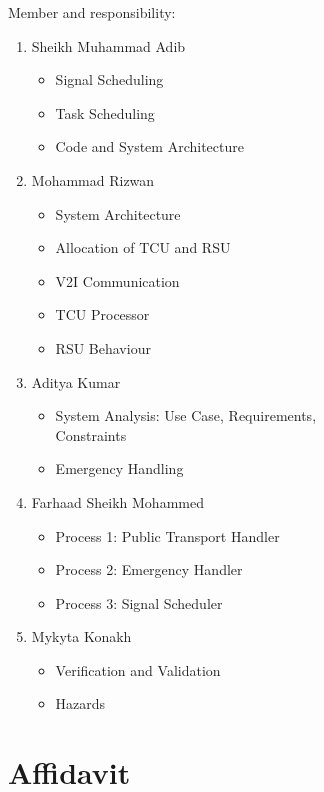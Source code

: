 \documentclass[conference]{IEEEtran}
\begin{document}
Member and responsibility:
\begin{enumerate}
\item Sheikh Muhammad Adib
\begin{itemize}
    \item Signal Scheduling
    \item Task Scheduling
    \item Code and System Architecture
\end{itemize}

\item Mohammad Rizwan
\begin{itemize}
    \item System Architecture
    \item Allocation of TCU and RSU
    \item V2I Communication
    \item TCU Processor
    \item RSU Behaviour
\end{itemize}

\item Aditya Kumar
\begin{itemize}
    \item System Analysis: Use Case, Requirements,\\Constraints
    \item Emergency Handling
\end{itemize}

\item Farhaad Sheikh Mohammed
\begin{itemize}
    \item Process 1: Public Transport Handler
    \item Process 2: Emergency Handler
    \item Process 3: Signal Scheduler
\end{itemize}

\item Mykyta Konakh
\begin{itemize}
    \item Verification and Validation
    \item Hazards
\end{itemize}
\end{enumerate}

\section*{Affidavit}
\end{document}
